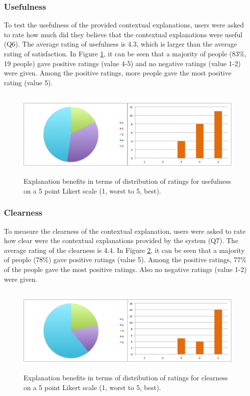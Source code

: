 \subsubsection{Usefulness} \label{sec:results_eb_u}

To test the usefulness of the provided contextual explanations, users were asked to rate how much did they believe that the contextual explanations were useful (Q6). The average rating of usefulness is 4.3, which is larger than the average rating of satisfaction. In Figure \ref{fig:usefulness}, it can be seen that a majority of people (83\%, 19 people) gave positive ratings (value 4-5) and no negative ratings (value 1-2) were given. Among the positive ratings, more people gave the most positive rating (value 5).

\begin{figure}[H]
	\centering
	\includegraphics[height=1.7in]{figures/usefulness.png}
	\caption{Explanation benefits in terms of distribution of ratings for usefulness on a 5 point Likert scale (1, worst to 5, best).}
	\label{fig:usefulness}
\end{figure}

\subsubsection{Clearness} \label{sec:results_eb_c}

To measure the clearness of the contextual explanation, users were asked to rate how clear were the contextual explanations provided by the system (Q7). The average rating of the clearness is 4.4. In Figure \ref{fig:clearness}, it can be seen that a majority of people (78\%) gave positive ratings (value 5). Among the positive ratings, 77\% of the people gave the most positive ratings. Also no negative ratings (value 1-2) were given. 

\begin{figure}[H]
	\centering
	\includegraphics[height=1.7in]{figures/clearness.png}
	\caption{Explanation benefits in terms of distribution of ratings for clearness on a 5 point Likert scale (1, worst to 5, best).}
	\label{fig:clearness}
\end{figure}


